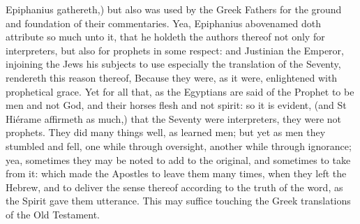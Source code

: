 Epiphanius gathereth,) but also was used by the Greek Fathers for the ground and foundation of their commentaries. Yea, Epiphanius abovenamed doth attribute so much unto it, that he holdeth the authors thereof not only for interpreters, but also for prophets in some respect: and Justinian the Emperor, injoining the Jews his subjects to use especially the translation of the Seventy, rendereth this reason thereof, Because they were, as it were, enlightened with prophetical grace. Yet for all that, as the Egyptians are said of the Prophet to be men and not God, and their horses flesh and not spirit: so it is evident, (and St Hiérame affirmeth as much,) that the Seventy were interpreters, they were not prophets. They did many things well, as learned men; but yet as men they stumbled and fell, one while through oversight, another while through ignorance; yea, sometimes they may be noted to add to the original, and sometimes to take from it: which made the Apostles to leave them many times, when they left the Hebrew, and to deliver the sense thereof according to the truth of the word, as the Spirit gave them utterance. This may suffice touching the Greek translations of the Old Testament.

